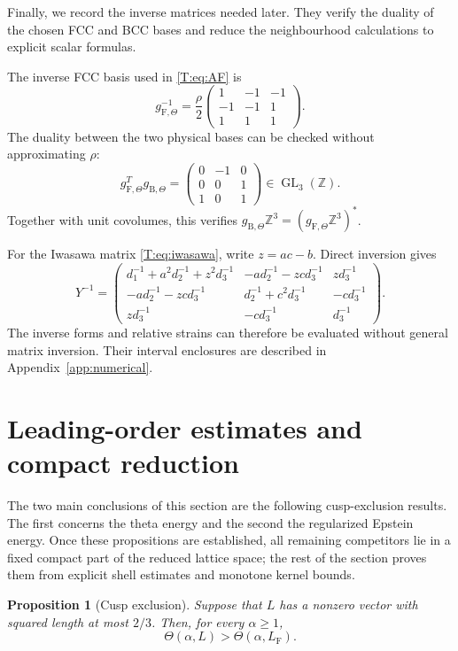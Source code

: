 \documentclass[reqno,english]{amsart}
\newtheorem{proposition}[theorem]{Proposition}
\theoremstyle{definition}
\newtheorem{open problem}[theorem]{Open Problem}
\theoremstyle{remark}
\theoremstyle{plain}
\numberwithin{equation}{section}
\newcommand{\Z}{\mathbb Z}
\newcommand{\FCC}{L_{\mathrm F}}
\newcommand{\Th}{\Theta}
\newcommand{\gFT}{g_{\mathrm F,\Theta}}
\newcommand{\gBT}{g_{\mathrm B,\Theta}}
\begin{document}
Finally, we record the inverse matrices needed later. They verify the
duality of the chosen FCC and BCC bases and reduce the neighbourhood
calculations to explicit scalar formulas.

The inverse FCC basis used in \eqref{T:eq:AF} is
\[
 \gFT^{-1}=\frac\rho2
 \begin{pmatrix}1&-1&-1\\-1&-1&1\\1&1&1\end{pmatrix}.
\]
The duality between the two physical bases can be checked without approximating $\rho$:
\[
 \gFT^T\gBT=
 \begin{pmatrix}0&-1&0\\0&0&1\\1&0&1\end{pmatrix}\in\operatorname{GL}_3(\Z).
\]
Together with unit covolumes, this verifies $\gBT\Z^3=(\gFT\Z^3)^*$.

For the Iwasawa matrix \eqref{T:eq:iwasawa}, write $z=ac-b$. Direct inversion gives
\begin{equation}\label{T:eq:inverseY}
 Y^{-1}=\begin{pmatrix}
 d_1^{-1}+a^2d_2^{-1}+z^2d_3^{-1}
 &-ad_2^{-1}-zcd_3^{-1}&zd_3^{-1}\\
 -ad_2^{-1}-zcd_3^{-1}
 &d_2^{-1}+c^2d_3^{-1}&-cd_3^{-1}\\
 zd_3^{-1}&-cd_3^{-1}&d_3^{-1}
 \end{pmatrix}.
\end{equation}
The inverse forms and relative strains can therefore be evaluated
without general matrix inversion. Their interval enclosures are
described in Appendix~\ref{app:numerical}.

\section{Leading-order estimates and compact reduction}\label{sec:shell-compactness}

The two main conclusions of this section are the following cusp-exclusion results. The first concerns the theta energy and the second the regularized Epstein energy. Once these propositions are established, all remaining competitors lie in a fixed compact part of the reduced lattice space; the rest of the section proves them from explicit shell estimates and monotone kernel bounds.

\begin{proposition}[Cusp exclusion]\label{T:prop:cusp}
Suppose that $L$ has a nonzero vector with squared length at most $2/3$. Then, for every $\alpha\ge1$,
\begin{equation}\label{T:eq:cuspstrict}
 \Th(\alpha,L)>\Th(\alpha,\FCC).
\end{equation}
\end{proposition}
\end{document}
